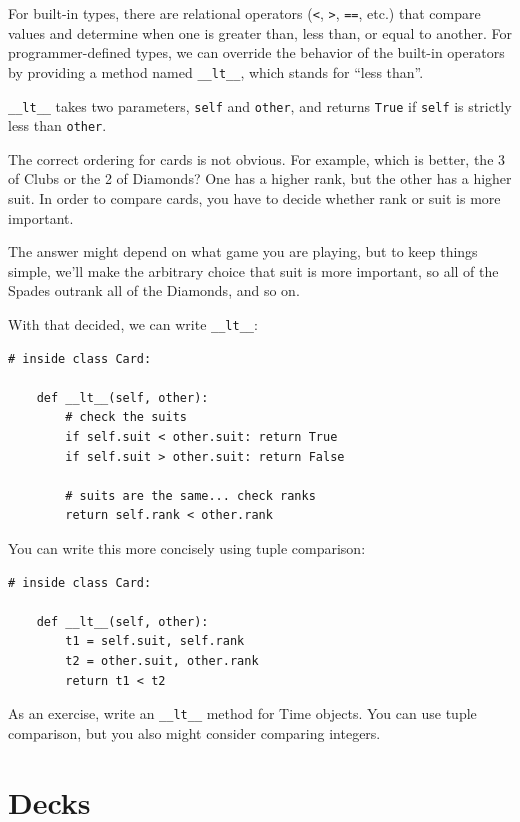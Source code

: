 \documentclass[10pt]{book}
\begin{document}
For built-in types, there are relational operators
({\tt <}, {\tt >}, {\tt ==}, etc.)
that compare
values and determine when one is greater than, less than, or equal to
another.  For programmer-defined types, we can override the behavior of
the built-in operators by providing a method named
\verb"__lt__", which stands for ``less than''.

\verb"__lt__" takes two parameters, {\tt self} and {\tt other},
and returns {\tt True} if {\tt self} is strictly less than {\tt other}.

The correct ordering for cards is not obvious.
For example, which
is better, the 3 of Clubs or the 2 of Diamonds?  One has a higher
rank, but the other has a higher suit.  In order to compare
cards, you have to decide whether rank or suit is more important.

The answer might depend on what game you are playing, but to keep
things simple, we'll make the arbitrary choice that suit is more
important, so all of the Spades outrank all of the Diamonds,
and so on.

With that decided, we can write \verb"__lt__":

\begin{verbatim}
# inside class Card:

    def __lt__(self, other):
        # check the suits
        if self.suit < other.suit: return True
        if self.suit > other.suit: return False

        # suits are the same... check ranks
        return self.rank < other.rank
\end{verbatim}
%
You can write this more concisely using tuple comparison:

\begin{verbatim}
# inside class Card:

    def __lt__(self, other):
        t1 = self.suit, self.rank
        t2 = other.suit, other.rank
        return t1 < t2
\end{verbatim}
%
As an exercise, write an \verb"__lt__" method for Time objects.  You
can use tuple comparison, but you also might consider
comparing integers.


\section{Decks}
\end{document}
